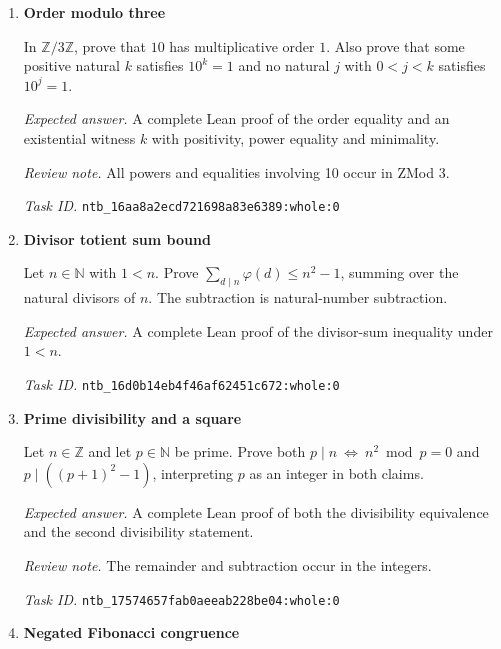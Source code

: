 \documentclass[11pt]{article}
\newcommand{\pth}[1]{\nolinkurl{#1}}
\begin{document}
\begin{enumerate}[label={TEST \arabic*.},leftmargin=4.5em,itemsep=1em]
Let $p,a,b,k\in\mathbb{N}$. Assume $p$ is prime, $a>0$, $b>0$, $ab=p^k$ and $\gcd(a,b)=1$. Prove that $a$ and $b$ are each powers of $p$ with natural exponents.

\emph{Expected answer.} A complete Lean proof supplying $i,j\in\mathbb{N}$ with $a=p^i$ and $b=p^j$. No relation between $i,j$ beyond these equalities is requested.

\emph{Task ID.} \pth{ntb_1413c3ebe87c42aaf582105d:whole:0}

\item \textbf{Order modulo three}\label{qn:test:5}

In $\mathbb{Z}/3\mathbb{Z}$, prove that $10$ has multiplicative order $1$. Also prove that some positive natural $k$ satisfies $10^k=1$ and no natural $j$ with $0<j<k$ satisfies $10^j=1$.

\emph{Expected answer.} A complete Lean proof of the order equality and an existential witness $k$ with positivity, power equality and minimality.

\emph{Review note.} All powers and equalities involving 10 occur in ZMod 3.

\emph{Task ID.} \pth{ntb_16aa8a2ecd721698a83e6389:whole:0}

\item \textbf{Divisor totient sum bound}\label{qn:test:6}

Let $n\in\mathbb{N}$ with $1<n$. Prove $\sum_{d\mid n}\varphi(d)\le n^2-1$, summing over the natural divisors of $n$. The subtraction is natural-number subtraction.

\emph{Expected answer.} A complete Lean proof of the divisor-sum inequality under $1<n$.

\emph{Task ID.} \pth{ntb_16d0b14eb4f46af62451c672:whole:0}

\item \textbf{Prime divisibility and a square}\label{qn:test:7}

Let $n\in\mathbb{Z}$ and let $p\in\mathbb{N}$ be prime. Prove both $p\mid n\ \Longleftrightarrow\ n^2\bmod p=0$ and $p\mid((p+1)^2-1)$, interpreting $p$ as an integer in both claims.

\emph{Expected answer.} A complete Lean proof of both the divisibility equivalence and the second divisibility statement.

\emph{Review note.} The remainder and subtraction occur in the integers.

\emph{Task ID.} \pth{ntb_17574657fab0aeeab228be04:whole:0}

\item \textbf{Negated Fibonacci congruence}\label{qn:test:8}


\end{enumerate}
\end{document}
